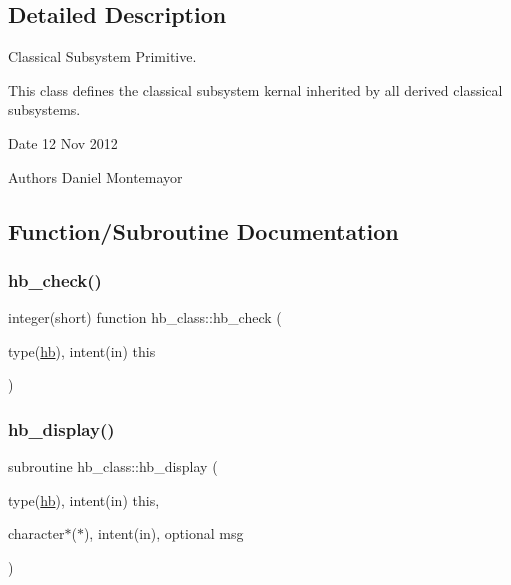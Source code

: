 \subsection{Detailed Description}
Classical Subsystem Primitive. 

This class defines the classical subsystem kernal inherited by all derived classical subsystems. \begin{DoxyDate}{Date}
12 Nov 2012 
\end{DoxyDate}
\begin{DoxyAuthor}{Authors}
Daniel Montemayor 
\end{DoxyAuthor}


\subsection{Function/\+Subroutine Documentation}
\mbox{\label{namespacehb__class_a84c1c4284b5897ff912c8c1671b6775f}} 
\subsubsection{\texorpdfstring{hb\+\_\+check()}{hb\_check()}}
{\footnotesize\ttfamily integer(short) function hb\+\_\+class\+::hb\+\_\+check (\begin{DoxyParamCaption}\item[{type(\hyperlink{structhb__class_1_1hb}{hb}), intent(in)}]{this }\end{DoxyParamCaption})\hspace{0.3cm}{\ttfamily [private]}}

\mbox{\label{namespacehb__class_a8d8a7109913e9189fbc950d34378727b}} 
\subsubsection{\texorpdfstring{hb\+\_\+display()}{hb\_display()}}
{\footnotesize\ttfamily subroutine hb\+\_\+class\+::hb\+\_\+display (\begin{DoxyParamCaption}\item[{type(\hyperlink{structhb__class_1_1hb}{hb}), intent(in)}]{this,  }\item[{character$\ast$($\ast$), intent(in), optional}]{msg }\end{DoxyParamCaption})\hspace{0.3cm}{\ttfamily [private]}}

